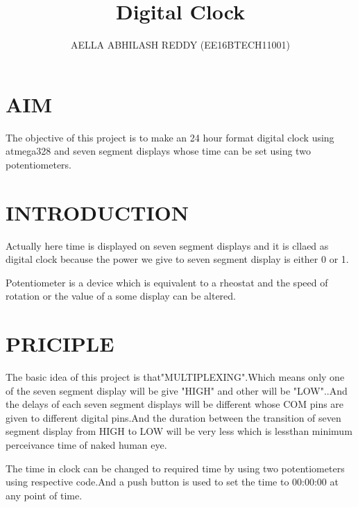 \documentclass{article}
\title{Digital Clock}
\author{AELLA ABHILASH REDDY (EE16BTECH11001)}
\date{}
\begin{document}
\maketitle



\section{\textbf{AIM}}
The objective of this project is to make an 24 hour format digital clock using atmega328 and seven segment displays whose time can be set using two potentiometers. 

\section{\textbf{INTRODUCTION}}
Actually here time is displayed on seven segment displays and it is cllaed as digital clock because the power we give to seven segment display is either 0 or 1.



Potentiometer is a device which is equivalent to a rheostat and the speed of rotation or the value of a some display can be altered.

\section{\textbf{PRICIPLE}}
The basic idea of this project is that"MULTIPLEXING".Which means only one of the seven segment display will be give "HIGH" and other will be "LOW"..And the delays of each seven segment displays will be different whose COM pins are given to different digital pins.And the duration between the transition of seven segment display from HIGH  to LOW will be very less which is lessthan minimum perceivance time of naked human eye.


 The time in clock can be changed to required time by using two potentiometers using respective code.And a push button is used to set the time to 00:00:00 at any point of time.
\end{document}
